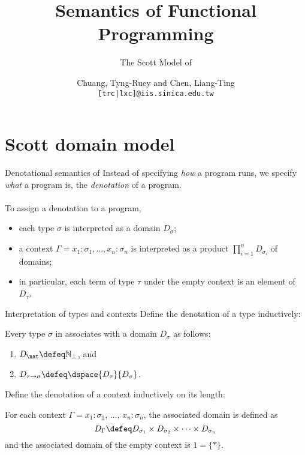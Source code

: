 \title{Semantics of Functional Programming}
\subtitle{The Scott Model of \PCF}
\author[T.-R. Chuang]{\alert{Chuang, Tyng-Ruey} and Chen, Liang-Ting  \\
  {\texttt{[\alert{trc}|lxc]@iis.sinica.edu.tw}}}

\frame{\maketitle}

\section{Scott domain model}
\begin{frame}{Denotational semantics of \PCF}
  Instead of specifying \emph{how} a \PCF{} program runs, we specify \emph{what} a
  program is, the \emph{denotation} of a program. 
  \\~\\
  To assign a denotation to a program, 
  \begin{itemize}
    \item each type $\sigma$ is interpreted as a domain $D_\sigma$;
    \item a context $\Gamma = x_1 : \sigma_1, \ldots, x_n : \sigma_n$
      is interpreted as a product $\prod_{i = 1}^n D_{\sigma_i}$ of domains;
    \item in particular, each term of type $\tau$ under the empty context
      is an element of $D_\tau$. 
  \end{itemize}
\end{frame}

\begin{frame}{Interpretation of types and contexts}
  Define the denotation of a type inductively:
  \begin{definition}
  Every type $\sigma$ in \PCF{} associates with a domain $D_\sigma$ as
  follows:
    \begin{enumerate}
      \item $D_\nat \defeq \mathbb{N}_\bot$, and
      \item $D_{\tau \to \sigma} \defeq \dspace{D_\tau}{D_{\sigma}}$.
    \end{enumerate}
  \end{definition}
  Define the denotation of a context inductively on its length:
  \begin{definition}
    For each context $\Gamma = x_1 : \sigma_1,\,
    \ldots,\, x_n : \sigma_n$, the associated domain is defined as
    \[
      D_\Gamma \defeq D_{\sigma_1} \times D_{\sigma_2}
      \times \dots \times D_{\sigma_n}
    \]
    and the associated domain of the empty context is $1 = \{*\}$. 
  \end{definition}
\end{frame}

